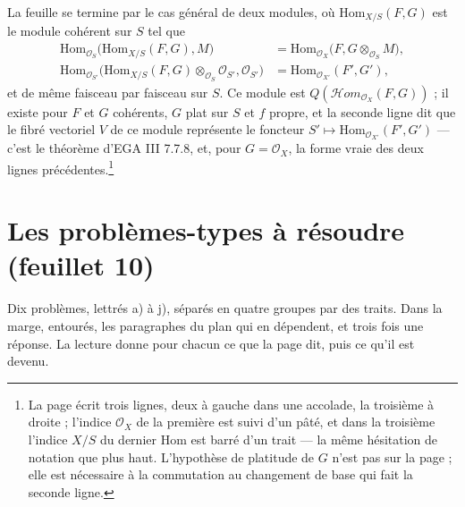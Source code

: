 \documentclass[11pt,a4paper]{article}
\begin{document}
La feuille se termine par le cas général de deux modules, où
$\mathrm{Hom}_{X/S}(F, G)$ est le module cohérent sur $S$ tel que
\begin{align*}
  \mathrm{Hom}_{\mathcal{O}_S}\bigl(\mathrm{Hom}_{X/S}(F, G), M\bigr)
    &= \mathrm{Hom}_{\mathcal{O}_X}\bigl(F, G \otimes_{\mathcal{O}_S} M\bigr) , \\
  \mathrm{Hom}_{\mathcal{O}_{S'}}\bigl(\mathrm{Hom}_{X/S}(F, G) \otimes_{\mathcal{O}_S} \mathcal{O}_{S'}, \mathcal{O}_{S'}\bigr)
    &= \mathrm{Hom}_{\mathcal{O}_{X'}}(F', G') ,
\end{align*}
et de même faisceau par faisceau sur $S$. Ce module est
$Q(\mathcal{H}om_{\mathcal{O}_X}(F, G))$ ; il existe pour $F$ et $G$ cohérents,
$G$ plat sur $S$ et $f$ propre, et la seconde ligne dit que le fibré
vectoriel $V$ de ce module représente le foncteur $S' \mapsto
\mathrm{Hom}_{\mathcal{O}_{X'}}(F', G')$ — c'est le théorème d'EGA III 7.7.8,
et, pour $G = \mathcal{O}_X$, la forme vraie des deux lignes
précédentes.\footnote{La page écrit trois lignes, deux à gauche dans une
accolade, la troisième à droite ; l'indice $\mathcal{O}_X$ de la première
est suivi d'un pâté, et dans la troisième l'indice $X/S$ du dernier
$\mathrm{Hom}$ est barré d'un trait — la même hésitation de notation que plus
haut. L'hypothèse de platitude de $G$ n'est pas sur la page ; elle est
nécessaire à la commutation au changement de base qui fait la seconde ligne.}

\section*{Les problèmes-types à résoudre (feuillet 10)}

Dix problèmes, lettrés a) à j), séparés en quatre groupes par des traits.
Dans la marge, entourés, les paragraphes du plan qui en dépendent, et trois
fois une réponse. La lecture donne pour chacun ce que la page dit, puis ce
qu'il est devenu.
\end{document}
